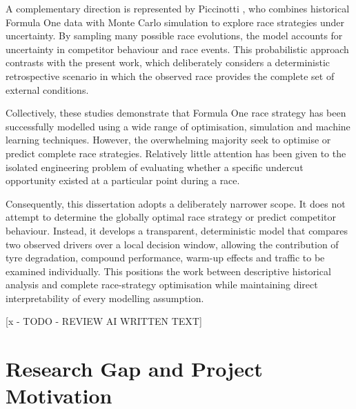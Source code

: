 A complementary direction is represented by Piccinotti \cite{Piccinotti2021}, who combines historical Formula One data with Monte Carlo simulation to explore race strategies under uncertainty. By sampling many possible race evolutions, the model accounts for uncertainty in competitor behaviour and race events. This probabilistic approach contrasts with the present work, which deliberately considers a deterministic retrospective scenario in which the observed race provides the complete set of external conditions.

Collectively, these studies demonstrate that Formula One race strategy has been successfully modelled using a wide range of optimisation, simulation and machine learning techniques. However, the overwhelming majority seek to optimise or predict complete race strategies. Relatively little attention has been given to the isolated engineering problem of evaluating whether a specific undercut opportunity existed at a particular point during a race.

Consequently, this dissertation adopts a deliberately narrower scope. It does not attempt to determine the globally optimal race strategy or predict competitor behaviour. Instead, it develops a transparent, deterministic model that compares two observed drivers over a local decision window, allowing the contribution of tyre degradation, compound performance, warm-up effects and traffic to be examined individually. This positions the work between descriptive historical analysis and complete race-strategy optimisation while maintaining direct interpretability of every modelling assumption.

[x - TODO - REVIEW AI WRITTEN TEXT]

\section{Research Gap and Project Motivation}
\label{sec:research-gap}

%
%


